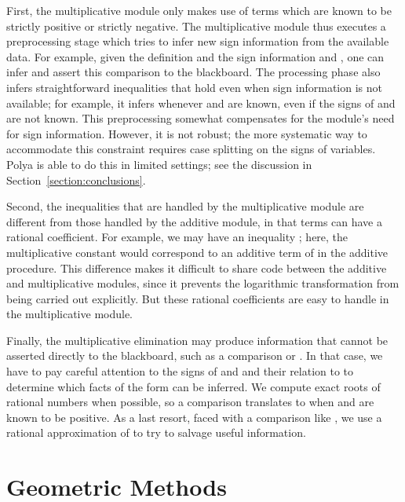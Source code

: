 \documentclass[runningheds]{llncs}
\begin{document}
First, the multiplicative module only makes use of terms  which are known to be strictly positive or strictly negative. The multiplicative module thus executes a preprocessing stage which tries to infer new sign information from the available data. For example, given the definition  and the sign information  and , one can infer  and assert this comparison to the blackboard. The processing phase also infers straightforward inequalities that hold even when sign information is not available; for example, it infers  whenever  and  are known, even if the signs of  and  are not known. This preprocessing somewhat compensates for the module's need for sign information. However, it is not robust; the more systematic way to accommodate this constraint requires case splitting on the signs of variables. Polya is able to do this in limited settings; see the discussion in Section~\ref{section:conclusions}.



Second, the inequalities that are handled by the multiplicative module
are different from those handled by the additive module, in that terms can have a rational coefficient. For example, we may have an inequality ; here, the multiplicative constant  would correspond to an additive term of  in the additive procedure. This difference makes it difficult to share code between the additive and multiplicative modules, since it prevents the logarithmic transformation from being carried out explicitly. But these rational coefficients are easy to handle in the multiplicative module. 

Finally, the multiplicative elimination may produce information that
cannot be asserted directly to the blackboard, such as a comparison
 or . In that case, we have to pay
careful attention to the signs of  and  and their relation
to  to determine which facts of the form  can be inferred. We compute exact roots of rational numbers when possible, so a comparison  translates to  when  and  are known to be positive. As a last resort, faced with a comparison like , we use a rational approximation of  to try to salvage useful information.

\section{Geometric Methods}
\label{section:geometric}
\end{document}
